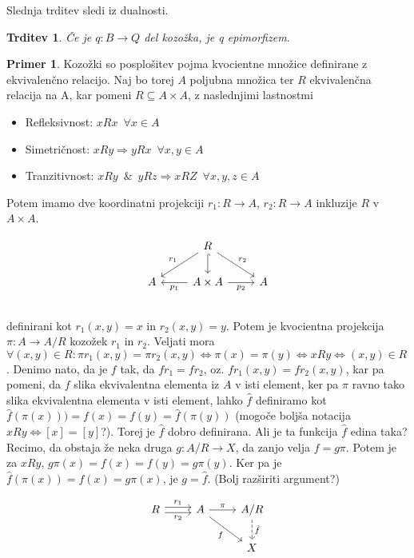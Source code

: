 \documentclass[12pt,a4paper]{book}
\theoremstyle{definition}
\theoremstyle{plain}
\newtheorem{trditev}[definicija]{Trditev}
\theoremstyle{definition}
\newtheorem{primer}{Primer}[section]
\theoremstyle{remark}
\begin{document}
Slednja trditev sledi iz dualnosti.

\begin{trditev}
Če je $q : B \to Q$ del kozožka, je q epimorfizem.
\end{trditev}

\begin{primer}
Kozožki so posplošitev pojma kvocientne množice definirane z ekvivalenčno relacijo. Naj bo torej $A$ poljubna množica ter $R$ ekvivalenčna relacija na A, kar pomeni $R \subseteq A \times A$, z naslednjimi lastnostmi
\begin{itemize}
\item Refleksivnost: $xRx \enspace \forall x \in A$
\item Simetričnost: $xRy \Rightarrow yRx \enspace \forall x,y \in A$
\item Tranzitivnost: $xRy \enspace\&\enspace yRz \Rightarrow xRZ \enspace \forall x,y,z \in A$
\end{itemize}
Potem imamo dve koordinatni projekciji $r_1 : R \to A$, $r_2 : R \to A$ inkluzije $R$ v $A \times A$.

$$\begin{tikzcd}
& R \ar[dl, "r_1"'] \ar[d, hook] \ar[dr, "r_2"] & \\
A & A \times A \ar[l, "p_1"] \ar[r, "p_2"'] & A \\
\end{tikzcd}$$
definirani kot $r_1(x,y) = x$ in $r_2(x,y) = y$. Potem je kvocientna projekcija $\pi : A \to A/R$ kozožek $r_1$ in $r_2$.
Veljati mora $\forall (x,y) \in R : \pi r_1(x,y) = \pi r_2(x,y) \Leftrightarrow \pi(x) = \pi(y) \Leftrightarrow xRy \Leftrightarrow (x,y) \in R$. Denimo nato, da je $f$ tak, da $fr_1 = fr_2$, oz. $fr_1(x,y) = fr_2(x,y) $, kar pa pomeni, da $f$ slika ekvivalentna elementa iz $A$ v isti element, ker pa $\pi$  ravno tako slika ekvivalentna elementa v isti element, lahko $\hat{f}$ definiramo kot $\hat{f}(\pi(x)) ) = f(x) = f(y) = \hat{f}(\pi(y))$ (mogoče boljša notacija $xRy \Leftrightarrow [x] = [y]$?). Torej je $\hat{f}$ dobro definirana. Ali je ta funkcija $\hat{f}$ edina taka? Recimo, da obstaja že neka druga $g : A/R \to X$, da zanjo velja $f = g\pi$. Potem je za $xRy$, $g\pi(x) = f(x) = f(y) = g\pi(y)$. Ker pa je $\hat{f}(\pi(x)) = f(x) = g\pi(x)$, je $g = \hat{f}$. (Bolj razširiti argument?)

$$\begin{tikzcd}
R \ar[r, shift left, "r_1"] \ar[r, shift right, "r_2"'] & A \ar[r, "\pi"] \ar[dr, "f"'] & A/R \ar[d, dashed, "\hat{f}"] \\
& & X \\
\end{tikzcd}$$



\end{primer}
\end{document}

